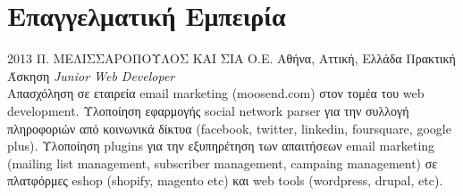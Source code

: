 \documentclass[print]{keros-cv} %
\begin{document}
\section{Επαγγελματική Εμπειρία}

\begin{entrylist}
\entry
{2013}
{Π. ΜΕΛΙΣΣΑΡΟΠΟΥΛΟΣ ΚΑΙ ΣΙΑ Ο.Ε.}
{Αθήνα, Αττική, Ελλάδα}
{Πρακτική Άσκηση \emph{Junior Web Developer} \\
Απασχόληση σε εταιρεία email marketing (moosend.com) στον τομέα
του web development. Υλοποίηση εφαρμογής social network parser για την συλλογή πληροφοριών από
κοινωνικά δίκτυα (facebook, twitter, linkedin, foursquare, google plus). Υλοποίηση plugins για την
εξυπηρέτηση των απαιτήσεων email marketing (mailing list management, subscriber management,
campaing management) σε πλατφόρμες eshop (shopify, magento etc) και web tools (wordpress, drupal,
etc).}
\end{entrylist}

\end{document}

